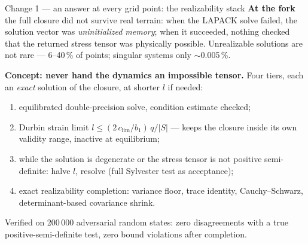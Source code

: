 \documentclass[10pt,aspectratio=169]{beamer}
\begin{document}
\begin{frame}{Change 1 --- an answer at every grid point: the realizability stack}
  \textbf{At the fork} the full closure did not survive real terrain: when the
  LAPACK solve failed, the solution vector was \emph{uninitialized memory}; when
  it succeeded, nothing checked that the returned stress tensor was physically
  possible. Unrealizable solutions are not rare --- 6--40\,\% of points; singular
  systems only $\sim$0.005\,\%.
  \vspace{1ex}

  \textbf{Concept: never hand the dynamics an impossible tensor.} Four tiers,
  each an \emph{exact} solution of the closure, at shorter $l$ if needed:
  \begin{enumerate}
    \item equilibrated double-precision solve, condition estimate checked;
    \item Durbin strain limit $l \le (2\,c_{\mathrm{lim}}/b_1)\,q/|S|$ ---
      keeps the closure inside its own validity range, inactive at equilibrium;
    \item while the solution is degenerate or the stress tensor is not positive
      semi-definite: halve $l$, resolve (full Sylvester test as acceptance);
    \item exact realizability completion: variance floor, trace identity,
      Cauchy--Schwarz, determinant-based covariance shrink.
  \end{enumerate}
  \vspace{1ex}
  Verified on 200\,000 adversarial random states: zero disagreements with a true
  positive-semi-definite test, zero bound violations after completion.
\end{frame}
\end{document}

